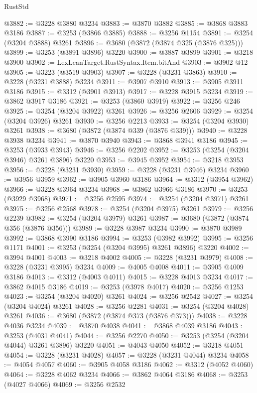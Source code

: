 \begin{lexlean}{RustStd}
\begin{coremodule}
@3882 := @3228 @3880 @3234
@3883 := @3870 @3882
@3885 := @3868 @3883 @3186
@3887 := @3253 (@3866 @3885)
@3888 := @3256 @1154
@3891 := @3254 (@3204 @3888) @3261
@3896 := @3680 (@3872 (@3874 @325 (@3876 @325)))
@3899 := @3253 (@3891 @3896) @3220
@3900 := @3887 @3899
@3901 := @3218 @3900
@3902 := LexLeanTarget.RustSyntax.Item.bitAnd
@3903 := @3902 @12
@3905 := @3223 (@3519 @3903)
@3907 := @3228 (@3231 @3863)
@3910 := @3228 (@3231 @3888) @3234
@3911 := @3907 @3910
@3913 := @3905 @3911 @3186
@3915 := @3312 (@3901 @3913)
@3917 := @3228 @3915 @3234
@3919 := @3862 @3917 @3186
@3921 := @3253 (@3860 @3919)
@3922 := @3256 @246
@3925 := @3254 (@3204 @3922) @3261
@3926 := @3256 @2606
@3929 := @3254 (@3204 @3926) @3261
@3930 := @3256 @2213
@3933 := @3254 (@3204 @3930) @3261
@3938 := @3680 (@3872 (@3874 @339 (@3876 @339)))
@3940 := @3228 @3938 @3234
@3941 := @3870 @3940
@3943 := @3868 @3941 @3186
@3945 := @3253 (@3933 @3943)
@3946 := @3256 @2202
@3952 := @3253 (@3254 (@3204 @3946) @3261 @3896) @3220
@3953 := @3945 @3952
@3954 := @3218 @3953
@3956 := @3228 (@3231 @3930)
@3959 := @3228 (@3231 @3946) @3234
@3960 := @3956 @3959
@3962 := @3905 @3960 @3186
@3964 := @3312 (@3954 @3962)
@3966 := @3228 @3964 @3234
@3968 := @3862 @3966 @3186
@3970 := @3253 (@3929 @3968)
@3971 := @3256 @2595
@3974 := @3254 (@3204 @3971) @3261
@3975 := @3256 @2568
@3978 := @3254 (@3204 @3975) @3261
@3979 := @3256 @2239
@3982 := @3254 (@3204 @3979) @3261
@3987 := @3680 (@3872 (@3874 @356 (@3876 @356)))
@3989 := @3228 @3987 @3234
@3990 := @3870 @3989
@3992 := @3868 @3990 @3186
@3994 := @3253 (@3982 @3992)
@3995 := @3256 @1171
@4001 := @3253 (@3254 (@3204 @3995) @3261 @3896) @3220
@4002 := @3994 @4001
@4003 := @3218 @4002
@4005 := @3228 (@3231 @3979)
@4008 := @3228 (@3231 @3995) @3234
@4009 := @4005 @4008
@4011 := @3905 @4009 @3186
@4013 := @3312 (@4003 @4011)
@4015 := @3228 @4013 @3234
@4017 := @3862 @4015 @3186
@4019 := @3253 (@3978 @4017)
@4020 := @3256 @1253
@4023 := @3254 (@3204 @4020) @3261
@4024 := @3256 @2542
@4027 := @3254 (@3204 @4024) @3261
@4028 := @3256 @2281
@4031 := @3254 (@3204 @4028) @3261
@4036 := @3680 (@3872 (@3874 @373 (@3876 @373)))
@4038 := @3228 @4036 @3234
@4039 := @3870 @4038
@4041 := @3868 @4039 @3186
@4043 := @3253 (@4031 @4041)
@4044 := @3256 @2270
@4050 := @3253 (@3254 (@3204 @4044) @3261 @3896) @3220
@4051 := @4043 @4050
@4052 := @3218 @4051
@4054 := @3228 (@3231 @4028)
@4057 := @3228 (@3231 @4044) @3234
@4058 := @4054 @4057
@4060 := @3905 @4058 @3186
@4062 := @3312 (@4052 @4060)
@4064 := @3228 @4062 @3234
@4066 := @3862 @4064 @3186
@4068 := @3253 (@4027 @4066)
@4069 := @3256 @2532

\end{coremodule}
\end{lexlean}
